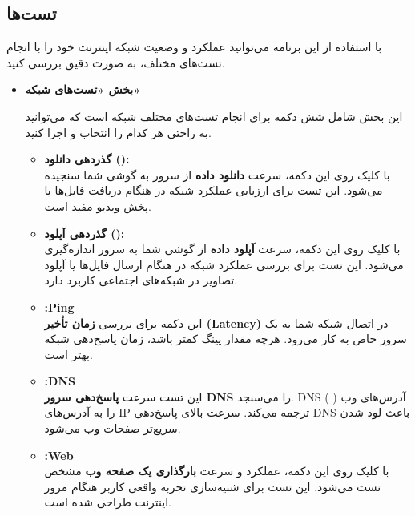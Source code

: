 \documentclass{report}
\begin{document}
\subsection{تست‌ها}

با استفاده از این برنامه می‌توانید عملکرد و وضعیت شبکه اینترنت خود را با انجام تست‌های مختلف، به صورت دقیق بررسی کنید.

\begin{itemize}
	\item \textbf{بخش «تست‌های شبکه»} 

این بخش شامل شش دکمه برای انجام تست‌های مختلف شبکه است که می‌توانید به راحتی هر کدام را انتخاب و اجرا کنید.

\begin{itemize}
	\item \textbf{گذردهی دانلود ():}\\
	با کلیک روی این دکمه، سرعت \textbf{دانلود داده} از سرور به گوشی شما سنجیده می‌شود. این تست برای ارزیابی عملکرد شبکه در هنگام دریافت فایل‌ها یا پخش ویدیو مفید است.
	
	\item \textbf{گذردهی آپلود ():}\\
	با کلیک روی این دکمه، سرعت \textbf{آپلود داده} از گوشی شما به سرور اندازه‌گیری می‌شود. این تست برای بررسی عملکرد شبکه در هنگام ارسال فایل‌ها یا آپلود تصاویر در شبکه‌های اجتماعی کاربرد دارد.
	
	\item \textbf{:Ping}\\
	این دکمه برای بررسی \textbf{زمان تأخیر (Latency)} در اتصال شبکه شما به یک سرور خاص به کار می‌رود. هرچه مقدار پینگ کمتر باشد، زمان پاسخ‌دهی شبکه بهتر است.
	
	\item \textbf{:DNS}\\
	این تست سرعت \textbf{پاسخ‌دهی سرور DNS} را می‌سنجد. DNS آدرس‌های وب ( ) را به آدرس‌های IP ترجمه می‌کند. سرعت بالای پاسخ‌دهی DNS باعث لود شدن سریع‌تر صفحات وب می‌شود.
	
	\item \textbf{:Web}\\
	با کلیک روی این دکمه، عملکرد و سرعت \textbf{بارگذاری یک صفحه وب} مشخص تست می‌شود. این تست برای شبیه‌سازی تجربه واقعی کاربر هنگام مرور اینترنت طراحی شده است.
	

\end{itemize}
\end{itemize}
\end{document}
